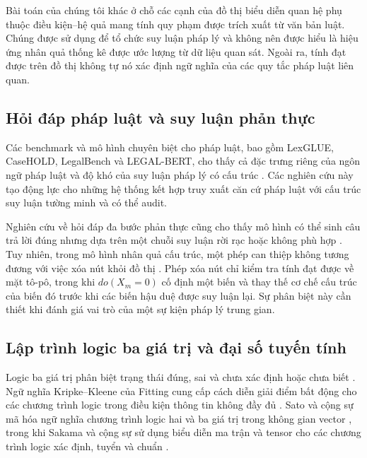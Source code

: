 Bài toán của chúng tôi khác ở chỗ các cạnh của đồ thị biểu diễn quan hệ phụ
thuộc điều kiện--hệ quả mang tính quy phạm được trích xuất từ văn bản luật.
Chúng được sử dụng để tổ chức suy luận pháp lý và không nên được hiểu là hiệu
ứng nhân quả thống kê được ước lượng từ dữ liệu quan sát. Ngoài ra, tính đạt
được trên đồ thị không tự nó xác định ngữ nghĩa của các quy tắc pháp luật liên
quan.

\subsection{Hỏi đáp pháp luật và suy luận phản thực}

Các benchmark và mô hình chuyên biệt cho pháp luật, bao gồm LexGLUE, CaseHOLD,
LegalBench và LEGAL-BERT, cho thấy cả đặc trưng riêng của ngôn ngữ pháp luật và
độ khó của suy luận pháp lý có cấu trúc
\cite{chalkidis2022lexglue,zheng2021casehold,guha2023legalbench,
chalkidis2020legalbert}. Các nghiên cứu này tạo động lực cho những hệ thống kết
hợp truy xuất căn cứ pháp luật với cấu trúc suy luận tường minh và có thể audit.

Nghiên cứu về hỏi đáp đa bước phản thực cũng cho thấy mô hình có thể sinh câu
trả lời đúng nhưng dựa trên một chuỗi suy luận rời rạc hoặc không phù hợp
\cite{guo2023counterfactual}. Tuy nhiên, trong mô hình nhân quả cấu trúc, một
phép can thiệp không tương đương với việc xóa nút khỏi đồ thị
\cite{pearl2009causality}. Phép xóa nút chỉ kiểm tra tính đạt được về mặt tô-pô,
trong khi $do(X_m=0)$ cố định một biến và thay thế cơ chế cấu trúc của biến đó
trước khi các biến hậu duệ được suy luận lại. Sự phân biệt này cần thiết khi
đánh giá vai trò của một sự kiện pháp lý trung gian.

\subsection{Lập trình logic ba giá trị và đại số tuyến tính}

Logic ba giá trị phân biệt trạng thái đúng, sai và chưa xác định hoặc chưa biết
\cite{kleene1952metamathematics}. Ngữ nghĩa Kripke--Kleene của Fitting cung cấp
cách diễn giải điểm bất động cho các chương trình logic trong điều kiện thông
tin không đầy đủ \cite{fitting1985kripke}. Sato và cộng sự mã hóa ngữ nghĩa
chương trình logic hai và ba giá trị trong không gian vector
\cite{sato2020threevalued}, trong khi Sakama và cộng sự sử dụng biểu diễn ma
trận và tensor cho các chương trình logic xác định, tuyển và chuẩn
\cite{sakama2021tensor}.


